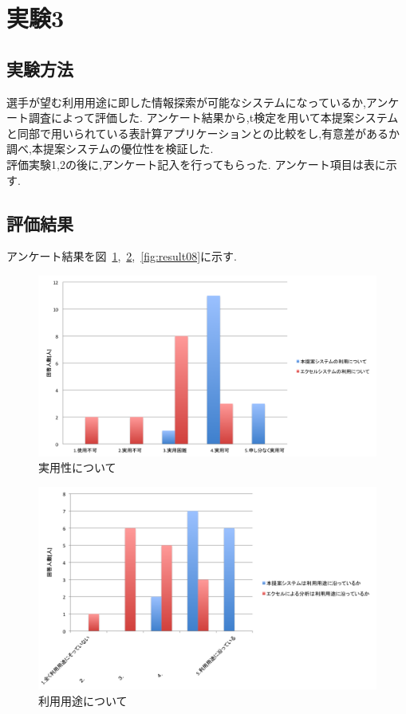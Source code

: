\documentclass[sotsuron]{kuee}
\begin{document}
	\section{実験3}
		\subsection{実験方法}
			選手が望む利用用途に即した情報探索が可能なシステムになっているか,アンケート調査によって評価した.
			アンケート結果から,t検定を用いて本提案システムと同部で用いられている表計算アプリケーションとの比較をし,有意差があるか調べ,本提案システムの優位性を検証した.
			\\評価実験1,2の後に,アンケート記入を行ってもらった.
			アンケート項目は表に示す.
		\subsection{評価結果}
		アンケート結果を図~\ref{fig:result06},~\ref{fig:result07},~\ref{fig:result08}に示す.
			\begin{figure}
				\begin{center}
					\includegraphics[width=\linewidth]{./png/result06.png}
				\end{center}
				\caption{実用性について}
		  		\label{fig:result06}
			\end{figure}
			\begin{figure}
				\begin{center}
					\includegraphics[width=\linewidth]{./png/result07.png}
				\end{center}
				\caption{利用用途について}
		  		\label{fig:result07}
			\end{figure}
\end{document}
